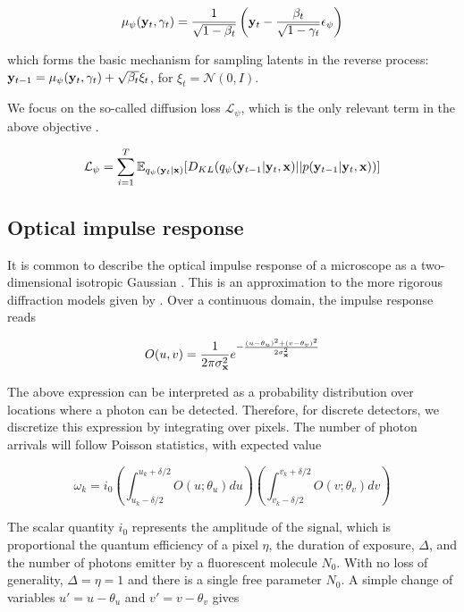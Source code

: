 \documentclass{article}
\begin{document}
\begin{equation}
\mu_{\psi}(\bold{y}_{t},\gamma_{t}) = \frac{1}{\sqrt{1-\beta_{t}}}\left(\bold{y}_{t} - \frac{\beta_{t}}{\sqrt{1-\gamma_{t}}}\epsilon_{\psi}\right)
\end{equation}

which forms the basic mechanism for sampling latents in the reverse process: $\bold{y}_{t-1} = \mu_{\psi}(\bold{y}_{t},\gamma_{t}) + \sqrt{\beta_{t}}\xi_{t}$, for $\xi_{t} = \mathcal{N}(0,I)$.


We focus on the so-called diffusion loss $\mathcal{L}_{\psi}$, which is the only relevant term in the above objective \citep{Ribeiro2024}.

\begin{equation}
\mathcal{L}_{\psi} = \sum_{i=1}^{T} \mathbb{E}_{q_{\psi}(\bold{y}_{t}|\bold{x})} [ D_{KL}(q_{\psi}(\bold{y}_{t-1}|\bold{y}_{t},\bold{x}) || p(\bold{y}_{t-1}|\bold{y}_{t},\bold{x})) ]
\end{equation}

\subsection{Optical impulse response}

It is common to describe the optical impulse response of a microscope as a two-dimensional isotropic Gaussian \citep{Zhang2007}. This is an approximation to the more rigorous diffraction models given by \citep{Richards1959,Gibson1989}. Over a continuous domain, the impulse response reads

\begin{equation*}
O(u,v) = \frac{1}{2\pi\sigma_{\bold{x}}^{2}}e^{-\frac{(u-\theta_{u})^{2}+(v-\theta_{v})^{2}}{2\sigma_{\bold{x}}^{2}}}
\end{equation*}

The above expression can be interpreted as a probability distribution over locations where a photon can be detected. Therefore, for discrete detectors, we discretize this expression by integrating over pixels. The number of photon arrivals will follow Poisson statistics, with expected value

\begin{equation*}
\omega_{k} = i_{0}\left(\int_{u_{k}-\delta /2}^{u_{k}+\delta /2} O(u; \theta_{u})du \right)\left(\int_{v_{k}-\delta /2}^{v_{k}+\delta /2} O(v;\theta_{v})dv \right)
\end{equation*}

The scalar quantity $i_{0}$ represents the amplitude of the signal, which is proportional the quantum efficiency of a pixel $\eta$, the duration of exposure, $\Delta$, and the number of photons emitter by a fluorescent molecule $N_{0}$. With no loss of generality, $\Delta = \eta = 1$ and there is a single free parameter $N_{0}$. A simple change of variables $u' = u - \theta_{u}$ and $v' = v-\theta_{v}$ gives
\end{document}
